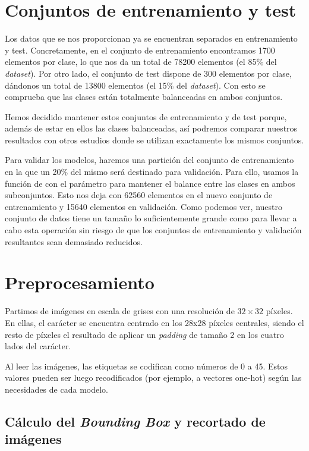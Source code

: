 \documentclass[a4]{article}
\begin{document}
\section{Conjuntos de entrenamiento y test}

Los datos que se nos proporcionan ya se encuentran separados en entrenamiento y test. Concretamente, en el conjunto de entrenamiento encontramos 1700 elementos por clase, lo que nos da un total de 78200 elementos (el 85\% del \textit{dataset}). Por otro lado, el conjunto de test dispone de 300 elementos por clase, dándonos un total de 13800 elementos (el 15\% del \textit{dataset}). Con esto se comprueba que las clases están totalmente balanceadas en ambos conjuntos.

Hemos decidido mantener estos conjuntos de entrenamiento y de test porque, además de estar en ellos las clases balanceadas, así podremos comparar nuestros resultados con otros estudios donde se utilizan exactamente los mismos conjuntos.

Para validar los modelos, haremos una partición del conjunto de entrenamiento en la que un 20\% del mismo será destinado para validación. Para ello, usamos la función  de  con el parámetro  para mantener el balance entre las clases en ambos subconjuntos. Esto nos deja con 62560 elementos en el nuevo conjunto de entrenamiento y 15640 elementos en validación. Como podemos ver, nuestro conjunto de datos tiene un tamaño lo suficientemente grande como para llevar a cabo esta operación sin riesgo de que los conjuntos de entrenamiento y validación resultantes sean demasiado reducidos.



\section{Preprocesamiento}

Partimos de imágenes en escala de grises con una resolución de $32 \times 32$ píxeles. En ellas, el carácter se encuentra centrado en los 28x28 píxeles centrales, siendo el resto de píxeles el resultado de aplicar un \textit{padding} de tamaño 2 en los cuatro lados del carácter.

Al leer las imágenes, las etiquetas se codifican como números de 0 a 45. Estos valores pueden ser luego recodificados (por ejemplo, a vectores one-hot) según las necesidades de cada modelo.

\subsection{Cálculo del \textit{Bounding Box} y recortado de imágenes}
\end{document}
